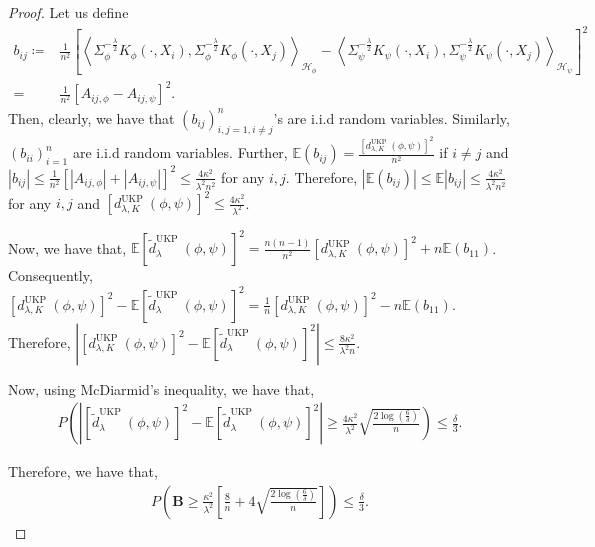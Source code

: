 \documentclass{article}
\theoremstyle{plain}
\newcommand{\E}{\mathbb{E}}
\newcommand{\repone}{\phi}
\newcommand{\reptwo}{\psi}
\newcommand{\Hone}{\mathcal{H}_{\phi}}
\newcommand{\Htwo}{\mathcal{H}_{\psi}}
\newcommand{\inprod}[1]{\left \langle #1 \right\rangle}
\newcommand{\metricstname}{UKP }
\begin{document}
\begin{proof}
Let us define 
\[
\begin{aligned}
    b_{ij} \coloneq& \frac{1}{n^{2}}\left[\inprod{\Sigma_{\repone}^{-\frac{\lambda}{2}}K_{\repone}(\cdot,X_{i}),\Sigma_{\repone}^{-\frac{\lambda}{2}}K_{\repone}(\cdot,X_{j})}_{\Hone}-\right.\left.\inprod{\Sigma_{\reptwo}^{-\frac{\lambda}{2}}K_{\reptwo}(\cdot,X_{i}),\Sigma_{\reptwo}^{-\frac{\lambda}{2}}K_{\reptwo}(\cdot,X_{j})}_{\Htwo}\right]^{2}\\
    =&\frac{1}{n^{2}}\left[A_{ij,\repone}-A_{ij,\reptwo}\right]^{2}.
\end{aligned}
\]
Then, clearly, we have that $\left(b_{ij}\right)_{i,j=1,i \neq j}^{n}$'s are i.i.d random variables. Similarly, $\left(b_{ii}\right)_{i=1}^{n}$ are i.i.d random variables. Further, $\E(b_{ij})=\frac{\left[d_{\lambda,K}^{\text{\metricstname}}(\repone,\reptwo)\right]^{2}}{n^{2}}$ if $i\neq j$ and $|b_{ij}|\leq \frac{1}{n^{2}}\left[|A_{ij,\repone}|+|A_{ij,\reptwo}|\right]^{2}\leq \frac{4\kappa^{2}}{\lambda^{2} n^{2}}$ for any $i,j$. Therefore, $\left|\E(b_{ij})\right|\leq \E\left|b_{ij}\right|\leq  \frac{4\kappa^{2}}{\lambda^{2} n^{2}}$ for any $i,j$ and $\left[d_{\lambda,K}^{\text{\metricstname}}(\repone,\reptwo)\right]^{2} \leq \frac{4\kappa^{2}}{\lambda^{2}}$.

Now, we have that, $\E\left[\tilde{d}_{\lambda}^{\text{\metricstname}}(\repone,\reptwo)\right]^{2} = \frac{n(n-1)}{n^{2}}\left[d_{\lambda,K}^{\text{\metricstname}}(\repone,\reptwo)\right]^{2} + n\E(b_{11})$. Consequently, $\left[d_{\lambda,K}^{\text{\metricstname}}(\repone,\reptwo)\right]^{2} - \E\left[\tilde{d}_{\lambda}^{\text{\metricstname}}(\repone,\reptwo)\right]^{2} = \frac{1}{n}\left[d_{\lambda,K}^{\text{\metricstname}}(\repone,\reptwo)\right]^{2} - n\E(b_{11})$. Therefore, $\left|\left[d_{\lambda,K}^{\text{\metricstname}}(\repone,\reptwo)\right]^{2} - \E\left[\tilde{d}_{\lambda}^{\text{\metricstname}}(\repone,\reptwo)\right]^{2}\right|\leq \frac{8\kappa^{2}}{\lambda^{2} n}$. 

Now, using McDiarmid's inequality, we have that,
\[
\begin{aligned}
    P\left(\left|\left[\tilde{d}_{\lambda}^{\text{\metricstname}}(\repone,\reptwo)\right]^{2} - \E\left[\tilde{d}_{\lambda}^{\text{\metricstname}}(\repone,\reptwo)\right]^{2}\right|\geq \right. \left.\frac{4\kappa^{2}}{\lambda^{2}}\sqrt{\frac{2\log(\frac{6}{\delta})}{n}}\right)\leq \frac{\delta}{3}.
\end{aligned}
\]

Therefore, we have that,
\[
\begin{aligned}
    P\left(\mathbf{B} \geq \frac{\kappa^{2}}{\lambda^{2}}\left[\frac{8}{n} + 4\sqrt{\frac{2\log(\frac{6}{\delta})}{n}}\right]\right) \leq \frac{\delta}{3}.
\end{aligned}
\]


\end{proof}
\end{document}

